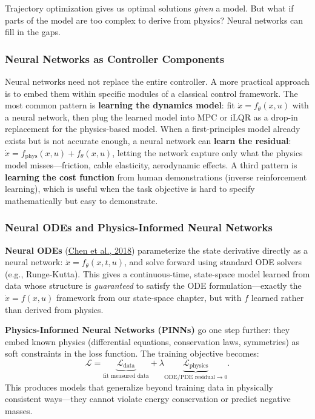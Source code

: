 Trajectory optimization gives us optimal solutions \emph{given} a model. But what if parts of the model are too complex to derive from physics? Neural networks can fill in the gaps.

\subsubsection{Neural Networks as Controller Components}

Neural networks need not replace the entire controller. A more practical approach is to embed them within specific modules of a classical control framework. The most common pattern is \textbf{learning the dynamics model}: fit $\dot{x} = f_\theta(x, u)$ with a neural network, then plug the learned model into MPC or iLQR as a drop-in replacement for the physics-based model. When a first-principles model already exists but is not accurate enough, a neural network can \textbf{learn the residual}: $\dot{x} = f_{\mathrm{phys}}(x, u) + f_\theta(x, u)$, letting the network capture only what the physics model misses---friction, cable elasticity, aerodynamic effects. A third pattern is \textbf{learning the cost function} from human demonstrations (inverse reinforcement learning), which is useful when the task objective is hard to specify mathematically but easy to demonstrate.

\subsubsection{Neural ODEs and Physics-Informed Neural Networks}

\textbf{Neural ODEs} (\href{https://arxiv.org/abs/1806.07366}{Chen et al., 2018}) parameterize the state derivative directly as a neural network: $\dot{x} = f_\theta(x, t, u)$, and solve forward using standard ODE solvers (e.g., Runge-Kutta). This gives a continuous-time, state-space model learned from data whose structure is \emph{guaranteed} to satisfy the ODE formulation---exactly the $\dot{x} = f(x, u)$ framework from our state-space chapter, but with $f$ learned rather than derived from physics.

\textbf{Physics-Informed Neural Networks (PINNs)} go one step further: they embed known physics (differential equations, conservation laws, symmetries) as soft constraints in the loss function. The training objective becomes:
\[
\mathcal{L} = \underbrace{\mathcal{L}_{\mathrm{data}}}_{\text{fit measured data}} + \lambda \underbrace{\mathcal{L}_{\mathrm{physics}}}_{\text{ODE/PDE residual} \to 0}.
\]
This produces models that generalize beyond training data in physically consistent ways---they cannot violate energy conservation or predict negative masses.

